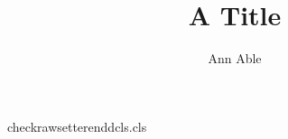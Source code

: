 \begin{filecontents*}[force]{checkrawsetterenddcls.cls}
\newcount\aucount
\def\author#1{\advance\aucount by 1 \gdef\@author{#1}}
\def\closing#1{\g@addto@macro\@closing{#1}}\def\@closing{}
\newcommand{\printclosing}{\@closing}
\renewcommand\maketitle{\par{\@title\par}\ifnum\aucount>0 {\@author\par}\fi}
\end{filecontents*}
\documentclass{checkrawsetterenddcls}
\title{A Title}\author{Ann Able}
\closing{}
\closing{\enddocument}
\makeatletter\closing{\@@end}\makeatother
\maketitle
\section{One}
Body text one.

Body text two.

